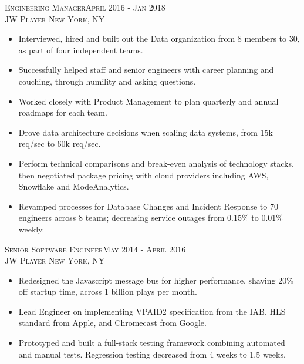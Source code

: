 \documentclass[oneside, final]{scrartcl}
\begin{document}
\begin{center}
\textsc{Engineering Manager\hfill April 2016 - Jan 2018\\}
\textsc{JW Player \hfill New York, NY\\}
\begin{itemize}
	\setlength{\itemsep}{1pt}
	\setlength{\parskip}{0pt}
	\setlength{\parsep}{0pt}
	\setlength{\leftmargin}{-5mm}
	\item Interviewed, hired and built out the Data organization from 8 members to 30, as part of four independent teams.
	\item Successfully helped staff and senior engineers with career planning and couching, through humility and asking questions.
	\item Worked closely with Product Management to plan quarterly and annual roadmaps for each team.
	\item Drove data architecture decisions when scaling data systems, from 15k req/sec to 60k req/sec.
	\item Perform technical comparisons and break-even analysis of technology stacks, then negotiated package pricing with cloud providers including AWS, Snowflake and ModeAnalytics.
	\item Revamped processes for Database Changes and Incident Response to 70 engineers across 8 teams; decreasing service outages from 0.15\% to 0.01\% weekly.
\end{itemize}


\textsc{Senior Software Engineer\hfill May 2014 - April 2016\\}
\textsc{JW Player \hfill New York, NY\\}
\begin{itemize}
	\setlength{\itemsep}{1pt}
	\setlength{\itemsep}{1pt}
	\setlength{\parskip}{0pt}
	\setlength{\parsep}{0pt}
	\setlength{\leftmargin}{-5mm}
        \item Redesigned the Javascript message bus for higher performance, shaving 20\% off startup time, across 1 billion plays per month.
        \item Lead Engineer on implementing VPAID2 specification from the IAB, HLS standard from Apple, and Chromecast from Google.
        \item Prototyped and built a full-stack testing framework combining automated and manual tests. Regression testing decreased from 4 weeks to 1.5 weeks.
\end{itemize}



\end{center}
\end{document}

